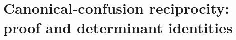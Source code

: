 %
%
%
\section{Canonical-confusion reciprocity: proof and determinant identities}
\label{supp:reciprocity}


